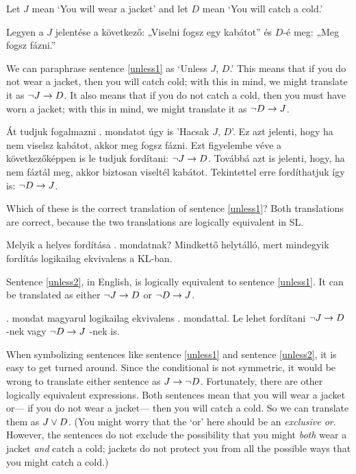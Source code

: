 

Let $J$ mean `You will wear a jacket' and let $D$ mean `You will catch a cold.'

Legyen a $J$ jelentése a következő: „Viselni fogsz egy kabátot” és $D$-é meg: „Meg fogsz fázni.”

We can paraphrase sentence \ref{unless1} as `Unless $J$, $D$.' This means that if you do not wear a jacket, then you will catch cold; with this in mind, we might translate it as $\neg J \rightarrow D$. It also means that if you do not catch a cold, then you must have worn a jacket; with this in mind, we might translate it as $\neg D \rightarrow J$.

Át tudjuk fogalmazni . mondatot úgy is 'Hacsak $J$, $D$'. Ez azt jelenti, hogy ha nem viselsz kabátot, akkor meg fogsz fázni. Ezt figyelembe véve a következőképpen is le tudjuk fordítani: $\neg J \rightarrow D$. Továbbá azt is jelenti, hogy, ha nem fáztál meg, akkor biztosan viseltél kabátot. Tekintettel erre fordíthatjuk így is: $\neg D \rightarrow J$.

Which of these is the correct translation of sentence \ref{unless1}? Both translations are correct, because the two translations are logically equivalent in SL.

Melyik a helyes fordítása . mondatnak? Mindkettő helytálló, mert mindegyik fordítás logikailag ekvivalens a KL-ban.

Sentence \ref{unless2}, in English, is logically equivalent to sentence \ref{unless1}. It can be translated as either $\neg J \rightarrow D$ or $\neg D \rightarrow J$.

. mondat magyarul logikailag ekvivalens . mondattal. Le lehet fordítani $\neg J \rightarrow D$ -nek vagy $\neg D \rightarrow J$ -nek is.

When symbolizing sentences like sentence \ref{unless1} and sentence \ref{unless2}, it is easy to get turned around. Since the conditional is not symmetric, it would be wrong to translate either sentence as $J \rightarrow \neg D$. Fortunately, there are other logically equivalent expressions. Both sentences mean that you will wear a jacket or--- if you do not wear a jacket--- then you will catch a cold. So we can translate them as $J \vee D$. (You might worry that the `or' here should be an \emph{exclusive or}. However, the sentences do not exclude the possibility that you might \emph{both} wear a jacket \emph{and} catch a cold; jackets do not protect you from all the possible ways that you might catch a cold.)


